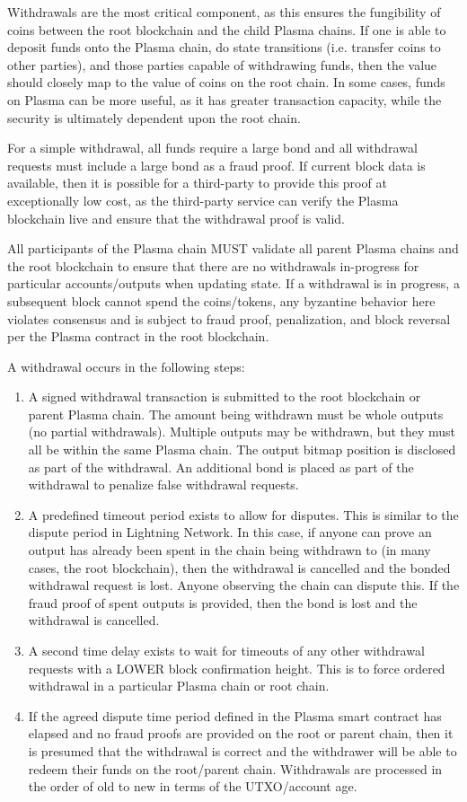 \documentclass[letterpaper, 11pt]{article}
\begin{document}
Withdrawals are the most critical component, as this ensures the fungibility of
coins between the root blockchain and the child Plasma chains. If one is able to
deposit funds onto the Plasma chain, do state transitions (i.e. transfer coins
to other parties), and those parties capable of withdrawing funds, then the
value should closely map to the value of coins on the root chain. In some cases,
funds on Plasma can be more useful, as it has greater transaction capacity,
while the security is ultimately dependent upon the root chain.

For a simple withdrawal, all funds require a large bond and all withdrawal
requests must include a large bond as a fraud proof. If current block data is
available, then it is possible for a third-party to provide this proof at
exceptionally low cost, as the third-party service can verify the Plasma
blockchain live and ensure that the withdrawal proof is valid.

All participants of the Plasma chain MUST validate all parent Plasma chains and
the root blockchain to ensure that there are no withdrawals in-progress for
particular accounts/outputs when updating state. If a withdrawal is in progress,
a subsequent block cannot spend the coins/tokens, any byzantine behavior here
violates consensus and is subject to fraud proof, penalization, and block
reversal per the Plasma contract in the root blockchain.

A withdrawal occurs in the following steps:
\begin{enumerate}
	\item
		A signed withdrawal transaction is submitted to the root
		blockchain or parent Plasma chain. The amount being withdrawn
		must be whole outputs (no partial withdrawals). Multiple outputs
		may be withdrawn, but they must all be within the same Plasma
		chain. The output bitmap position is disclosed as part of the
		withdrawal. An additional bond is placed as part of the
		withdrawal to penalize false withdrawal requests.
	\item
		A predefined timeout period exists to allow for disputes. This
		is similar to the dispute period in Lightning Network. In this
		case, if anyone can prove an output has already been spent in
		the chain being withdrawn to (in many cases, the root
		blockchain), then the withdrawal is cancelled and the bonded
		withdrawal request is lost. Anyone observing the chain can
		dispute this. If the fraud proof of spent outputs is provided,
		then the bond is lost and the withdrawal is cancelled.
	\item
		A second time delay exists to wait for timeouts of any other
		withdrawal requests with a LOWER block confirmation height. This
		is to force ordered withdrawal in a particular Plasma chain or
		root chain.
	\item
		If the agreed dispute time period defined in the Plasma smart
		contract has elapsed and no fraud proofs are provided on the
		root or parent chain, then it is presumed that the withdrawal is
		correct and the withdrawer will be able to redeem their funds on
		the root/parent chain. Withdrawals are processed in the order of
		old to new in terms of the UTXO/account age.
\end{enumerate}
\end{document}
